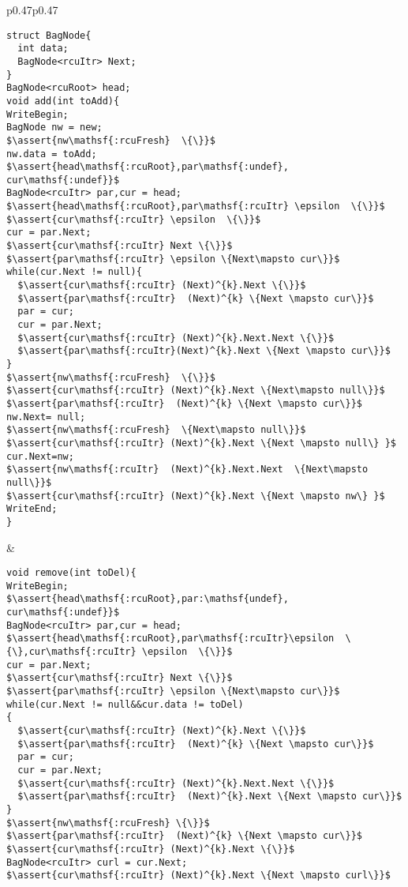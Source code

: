 \begin{figure*}[t!]
\begin{tabular}{p{}p{}}
\begin{lstlisting}[basicstyle=\scriptsize\ttfamily]
struct BagNode{
  int data;
  BagNode<rcuItr> Next;
}
BagNode<rcuRoot> head;
void add(int toAdd){
WriteBegin;
BagNode nw = new;
$\assert{nw\mathsf{:rcuFresh}  \{\}}$
nw.data = toAdd;
$\assert{head\mathsf{:rcuRoot},par\mathsf{:undef}, cur\mathsf{:undef}}$
BagNode<rcuItr> par,cur = head;
$\assert{head\mathsf{:rcuRoot},par\mathsf{:rcuItr} \epsilon  \{\}}$
$\assert{cur\mathsf{:rcuItr} \epsilon  \{\}}$
cur = par.Next;
$\assert{cur\mathsf{:rcuItr} Next \{\}}$
$\assert{par\mathsf{:rcuItr} \epsilon \{Next\mapsto cur\}}$
while(cur.Next != null){
  $\assert{cur\mathsf{:rcuItr} (Next)^{k}.Next \{\}}$
  $\assert{par\mathsf{:rcuItr}  (Next)^{k} \{Next \mapsto cur\}}$
  par = cur;
  cur = par.Next;
  $\assert{cur\mathsf{:rcuItr} (Next)^{k}.Next.Next \{\}}$
  $\assert{par\mathsf{:rcuItr}(Next)^{k}.Next \{Next \mapsto cur\}}$
}
$\assert{nw\mathsf{:rcuFresh}  \{\}}$
$\assert{cur\mathsf{:rcuItr} (Next)^{k}.Next \{Next\mapsto null\}}$
$\assert{par\mathsf{:rcuItr}  (Next)^{k} \{Next \mapsto cur\}}$
nw.Next= null;
$\assert{nw\mathsf{:rcuFresh}  \{Next\mapsto null\}}$
$\assert{cur\mathsf{:rcuItr} (Next)^{k}.Next \{Next \mapsto null\} }$
cur.Next=nw;
$\assert{nw\mathsf{:rcuItr}  (Next)^{k}.Next.Next  \{Next\mapsto null\}}$
$\assert{cur\mathsf{:rcuItr} (Next)^{k}.Next \{Next \mapsto nw\} }$
WriteEnd;
}
\end{lstlisting}&
\begin{lstlisting}[basicstyle=\scriptsize\ttfamily]
void remove(int toDel){
WriteBegin;
$\assert{head\mathsf{:rcuRoot},par:\mathsf{undef}, cur\mathsf{:undef}}$
BagNode<rcuItr> par,cur = head;
$\assert{head\mathsf{:rcuRoot},par\mathsf{:rcuItr}\epsilon  \{\},cur\mathsf{:rcuItr} \epsilon  \{\}}$
cur = par.Next;
$\assert{cur\mathsf{:rcuItr} Next \{\}}$
$\assert{par\mathsf{:rcuItr} \epsilon \{Next\mapsto cur\}}$
while(cur.Next != null&&cur.data != toDel)
{
  $\assert{cur\mathsf{:rcuItr} (Next)^{k}.Next \{\}}$
  $\assert{par\mathsf{:rcuItr}  (Next)^{k} \{Next \mapsto cur\}}$
  par = cur;
  cur = par.Next;
  $\assert{cur\mathsf{:rcuItr} (Next)^{k}.Next.Next \{\}}$
  $\assert{par\mathsf{:rcuItr}  (Next)^{k}.Next \{Next \mapsto cur\}}$
}
$\assert{nw\mathsf{:rcuFresh} \{\}}$
$\assert{par\mathsf{:rcuItr}  (Next)^{k} \{Next \mapsto cur\}}$
$\assert{cur\mathsf{:rcuItr} (Next)^{k}.Next \{\}}$
BagNode<rcuItr> curl = cur.Next;
$\assert{cur\mathsf{:rcuItr} (Next)^{k}.Next \{Next \mapsto curl\}}$

\end{lstlisting}
\end{tabular}
\end{figure*}
